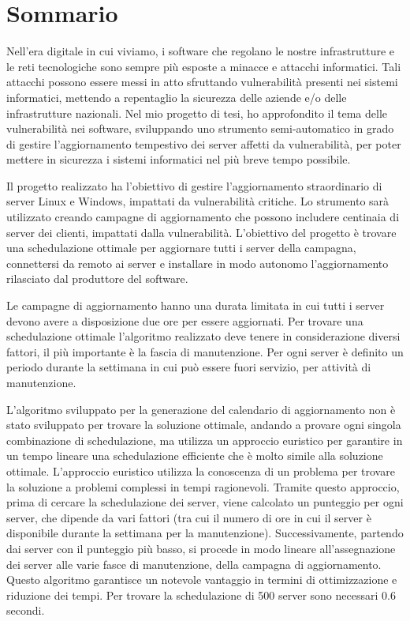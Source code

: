 \chapter*{Sommario}
Nell'era digitale in cui viviamo, i software che regolano le nostre 
infrastrutture e le reti tecnologiche sono sempre più esposte a minacce 
e attacchi informatici. Tali attacchi
possono essere messi in atto sfruttando vulnerabilità presenti nei sistemi 
informatici, mettendo a repentaglio la sicurezza delle aziende e/o delle 
infrastrutture nazionali.
Nel mio progetto di tesi, ho approfondito il tema delle vulnerabilità nei 
software, sviluppando uno strumento semi-automatico in grado di gestire 
l’aggiornamento tempestivo dei server affetti da vulnerabilità, per poter 
mettere in sicurezza i sistemi informatici nel più breve tempo possibile.
\newline

Il progetto realizzato ha l'obiettivo di gestire l’aggiornamento straordinario 
di server Linux e Windows, impattati da vulnerabilità critiche. Lo strumento 
sarà utilizzato creando campagne di aggiornamento che possono includere 
centinaia di server dei clienti, impattati dalla vulnerabilità. 
L'obiettivo del progetto è trovare una schedulazione ottimale per aggiornare 
tutti i server della campagna, connettersi da remoto ai server e installare 
in modo autonomo l'aggiornamento rilasciato dal produttore del software.

Le campagne di aggiornamento hanno una durata limitata in cui tutti i server 
devono avere a disposizione due ore per essere aggiornati. Per trovare una 
schedulazione ottimale l’algoritmo realizzato deve tenere in considerazione 
diversi fattori, il più importante è la fascia di manutenzione. 
Per ogni server è definito un periodo durante la settimana in cui può essere 
fuori servizio, per attività di manutenzione.
\newline

L’algoritmo sviluppato per la generazione del calendario di aggiornamento non 
è stato sviluppato per trovare la soluzione ottimale, andando a provare ogni 
singola combinazione di schedulazione, ma utilizza un approccio euristico per 
garantire in un tempo lineare una schedulazione efficiente che è molto simile 
alla soluzione ottimale.
L’approccio euristico utilizza la conoscenza di un problema per trovare la 
soluzione a problemi complessi in tempi ragionevoli. Tramite questo approccio, 
prima di cercare la schedulazione dei server, viene calcolato un punteggio per 
ogni server, che dipende da vari fattori (tra cui il numero di ore in cui il 
server è disponibile durante la settimana per la manutenzione). Successivamente, 
partendo dai server con il punteggio più basso, si procede in modo lineare 
all’assegnazione dei server alle varie fasce di manutenzione, della campagna di 
aggiornamento. Questo algoritmo garantisce un notevole vantaggio in termini di 
ottimizzazione e riduzione dei tempi. Per trovare la schedulazione di 500 server 
sono necessari 0.6 secondi.

